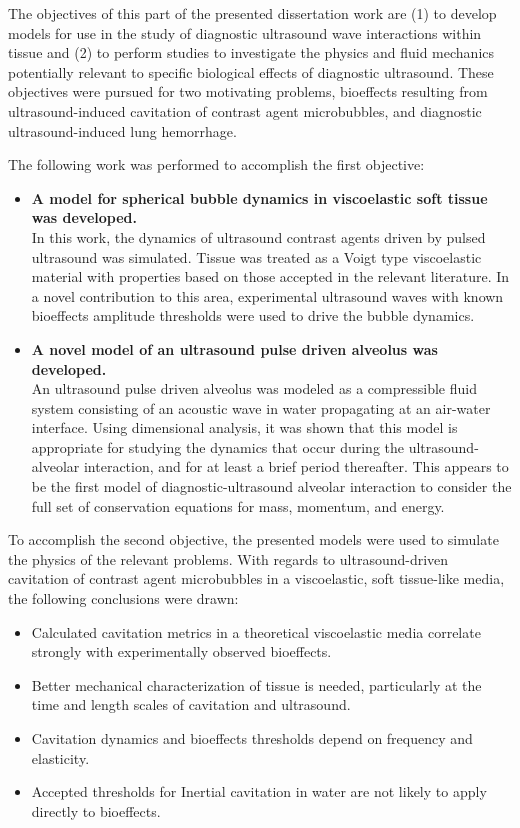 The objectives of this part of the presented dissertation work are (1)
to develop models for use in the study of diagnostic ultrasound wave
interactions within tissue and (2) to perform studies to investigate
the physics and fluid mechanics potentially relevant to specific
biological effects of diagnostic ultrasound. These objectives were
pursued for two motivating problems, bioeffects resulting from
ultrasound-induced cavitation of contrast agent microbubbles, and
diagnostic ultrasound-induced lung hemorrhage.

The following work was performed to accomplish the first objective:

\begin{itemize}
\item \textbf{A model for spherical bubble dynamics in viscoelastic soft tissue was developed.}\\
  In this work, the dynamics of ultrasound contrast agents driven by
  pulsed ultrasound was simulated. Tissue was treated as a Voigt type
  viscoelastic material with properties based on those accepted in the
  relevant literature. In a novel contribution to this area,
  experimental ultrasound waves with known bioeffects amplitude
  thresholds \citep{Miller2008b} were used to drive the bubble
  dynamics.

\item \textbf{A novel model of an ultrasound pulse driven alveolus was developed.}\\
  An ultrasound pulse driven alveolus was modeled as a compressible
  fluid system consisting of an acoustic wave in water propagating at
  an air-water interface. Using dimensional analysis, it was shown
  that this model is appropriate for studying the dynamics that occur
  during the ultrasound-alveolar interaction, and for at least a brief
  period thereafter. This appears to be the first model of
  diagnostic-ultrasound alveolar interaction to consider the full set
  of conservation equations for mass, momentum, and energy.
\end{itemize}


To accomplish the second objective, the presented models were used to
simulate the physics of the relevant problems. With regards to
ultrasound-driven cavitation of contrast agent microbubbles in a
viscoelastic, soft tissue-like media, the following conclusions were
drawn:
\begin{itemize}
\item Calculated cavitation metrics in a theoretical viscoelastic
  media correlate strongly with experimentally observed bioeffects.
\item Better mechanical characterization of tissue is needed,
  particularly at the time and length scales of cavitation and
  ultrasound.
\item Cavitation dynamics and bioeffects thresholds depend on
  frequency and elasticity.
\item Accepted thresholds for Inertial cavitation in water are not
  likely to apply directly to bioeffects.
\end{itemize}





